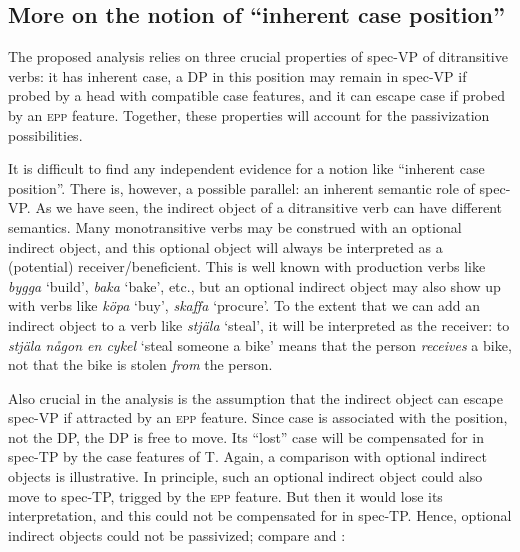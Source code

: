 \documentclass[output=paper]{langscibook}
\begin{document}
\subsection{More on the notion of “inherent case position”}\label{sec:falk:4.4}


The proposed analysis relies on three crucial properties of spec-VP of ditransitive verbs: it has inherent case, a DP in this position may remain in spec-VP if probed by a head with compatible case features, and it can escape case if probed by an \textsc{epp} feature. Together, these properties will account for the passivization possibilities.


It is difficult to find any independent evidence for a notion like “inherent case position”. There is, however, a possible parallel: an inherent semantic role of spec-VP. As we have seen, the indirect object of a ditransitive verb can have different semantics. Many monotransitive verbs may be construed with an optional indirect object, and this optional object will always be interpreted as a (potential) receiver/beneficient. This is well known with production verbs like \textit{bygga} ‘build’, \textit{baka} ‘bake’, etc., but an optional indirect object may also show up with verbs like \textit{köpa} ‘buy’, \textit{skaffa} ‘procure’. To the extent that we can add an indirect object to a verb like \textit{stjäla} ‘steal’, it will be interpreted as the receiver: to \textit{stjäla någon en cykel} ‘steal someone a bike’ means that the person \textit{receives} a bike, not that the bike is stolen \textit{from} the person. 



Also crucial in the analysis is the assumption that the indirect object can escape spec-VP if attracted by an \textsc{epp} feature. Since case is associated with the position, not the DP, the DP is free to move. Its “lost” case will be compensated for in spec-TP by the case features of T. Again, a comparison with optional indirect objects is illustrative. In principle, such an optional indirect object could also move to spec-TP, trigged by the \textsc{epp} feature. But then it would lose its interpretation, and this could not be compensated for in spec-TP. Hence, optional indirect objects could not be passivized; compare  and :


\ea%
    \label{ex:falk:23}
\end{document}
